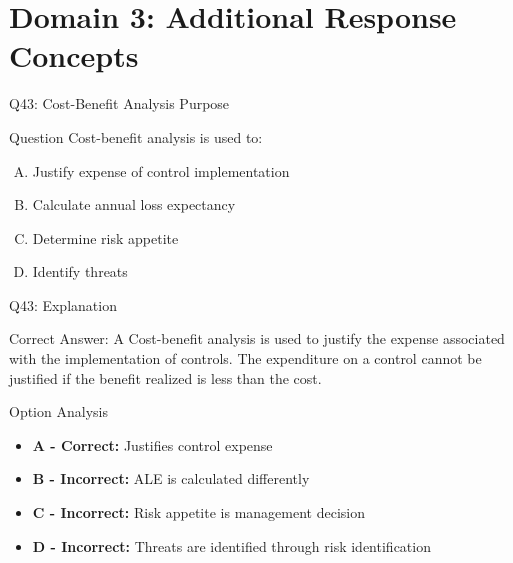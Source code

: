 \documentclass{beamer}
\begin{document}
	
	\section{Domain 3: Additional Response Concepts}
	
	\begin{frame}{Q43: Cost-Benefit Analysis Purpose}
		\begin{block}{Question}
			Cost-benefit analysis is used to:
		\end{block}
		\begin{enumerate}[(A)]
			\item Justify expense of control implementation
			\item Calculate annual loss expectancy
			\item Determine risk appetite
			\item Identify threats
		\end{enumerate}
	\end{frame}
	
	\begin{frame}{Q43: Explanation}
		\begin{block}{Correct Answer: A}
			Cost-benefit analysis is used to justify the expense associated with the implementation of controls. The expenditure on a control cannot be justified if the benefit realized is less than the cost.
		\end{block}
		\begin{block}{Option Analysis}
			\begin{itemize}
				\item \textbf{A - Correct:} Justifies control expense
				\item \textbf{B - Incorrect:} ALE is calculated differently
				\item \textbf{C - Incorrect:} Risk appetite is management decision
				\item \textbf{D - Incorrect:} Threats are identified through risk identification
			\end{itemize}
		\end{block}
	\end{frame}
	
	
	
\end{document}
